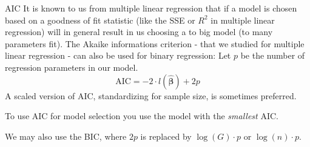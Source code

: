 \documentclass[
  ignorenonframetext,
]{beamer}
\begin{document}
\begin{frame}
\begin{block}{AIC}
\label{aic}
It is known to us from multiple linear regression that if a model is
chosen based on a goodness of fit statistic (like the SSE or \(R^2\) in
multiple linear regression) will in general result in us choosing a to
big model (to many parameters fit). The Akaike informations criterion -
that we studied for multiple linear regression - can also be used for
binary regression: Let \(p\) be the number of regression parameters in
our model. \[\text{AIC} =-2 \cdot l(\hat{\boldsymbol{\beta}})+2p\] A
scaled version of AIC, standardizing for sample size, is sometimes
preferred.

To use AIC for model selection you use the model with the
\emph{smallest} AIC.

We may also use the BIC, where \(2p\) is replaced by \(\log(G)\cdot p\)
or \(\log(n)\cdot p\).
\end{block}
\end{frame}
\end{document}
